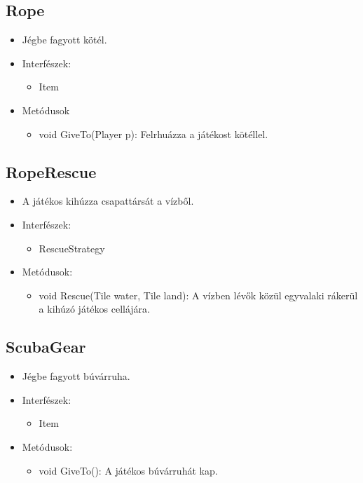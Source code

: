 \subsection{Rope}
\begin{itemize}
		\item Jégbe fagyott kötél.
	\item Interfészek:
	\begin{itemize}
		\item Item
	\end{itemize}
	\item Metódusok
	\begin{itemize}
		\item void GiveTo(Player p): Felrhuázza a játékost kötéllel.
	\end{itemize}
\end{itemize}

\subsection{RopeRescue}
\begin{itemize}
		\item A játékos kihúzza csapattársát a vízből.
	\item Interfészek:
	\begin{itemize}
		\item RescueStrategy
	\end{itemize}
	\item Metódusok:
	\begin{itemize}
		\item void Rescue(Tile water, Tile land): A vízben lévők közül egyvalaki rákerül a kihúzó játékos cellájára.
	\end{itemize}
\end{itemize}

\subsection{ScubaGear}
\begin{itemize}
		\item Jégbe fagyott búvárruha.
	\item Interfészek:
	\begin{itemize}
		\item Item
	\end{itemize}
	\item Metódusok:
	\begin{itemize}
		\item void GiveTo(): A játékos búvárruhát kap.
	\end{itemize}
\end{itemize}

